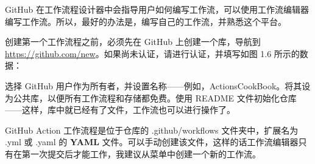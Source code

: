 
GitHub 在工作流程设计器中会指导用户如何编写工作流，可以使用工作流编辑器编写工作流。所以，最好的办法是，编写自己的工作流，并熟悉这个平台。


创建第一个工作流程之前，必须先在 GitHub 上创建一个库，导航到\url{https://github.com/new}。如果尚未认证，请进行认证，并填写如图 1.6 所示的数据：


选择 GitHub 用户作为所有者，并设置名称——例如，ActionsCookBook。将其设为公共库，以便所有工作流程和存储都免费。使用 README 文件初始化仓库——这样，库中就已经有了文件，工作流也可以进行操作了。


GitHub Action 工作流程是位于仓库的 .github/workflows 文件夹中，扩展名为 .yml 或 .yaml 的 \textbf{YAML} 文件。可以手动创建该文件，这样的话工作流编辑器只有在第一次提交后才能工作，我建议从菜单中创建一个新的工作流。

